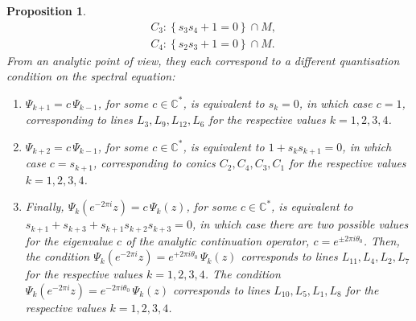 \documentclass[a4paper,reqno]{amsart}
\numberwithin{equation}{section}
\newtheorem{proposition}[theorem]{Proposition}
\numberwithin{equation}{section}
\begin{document}
\begin{proposition}
\begin{equation}
\begin{aligned}
            &C_3 : \left\{ s_3 s_4 + 1=0\right\}\cap M, \\
            &C_4 : \left\{ s_2 s_3 + 1=0\right\}\cap M. 
    \end{aligned}
    \end{equation}
From an analytic point of view, they each correspond to a different quantisation condition on the spectral equation:
 \begin{enumerate}
     \item $\Psi_{k+1}=c\,\Psi_{k-1}$, for some $c\in\mathbb{C}^*$, is equivalent to $s_k=0$, in which case $c=1$, corresponding to lines $L_3,L_9,L_{12},L_{6}$ for the respective values $k=1,2,3,4$.
     \item $\Psi_{k+2}=c\,\Psi_{k-1}$, for some $c\in\mathbb{C}^*$, is equivalent to $1+s_ks_{k+1}=0$, in which case $c=s_{k+1}$, corresponding to conics $C_2,C_4,C_3,C_1$ for the respective values $k=1,2,3,4$.
     \item Finally, $\Psi_k(e^{-2\pi i}z)=c\,\Psi_k(z)$, for some $c\in\mathbb{C}^*$, is equivalent to $s_{k+1}+s_{k+3}+s_{k+1}s_{k+2}s_{k+3}=0$, in which case there are two possible values for the eigenvalue $c$ of the analytic continuation operator, $c=e^{\pm 2\pi i\theta_0}$. Then, the condition $\Psi_k(e^{-2\pi i}z)=e^{+ 2\pi i\theta_0}\,\Psi_k(z)$ corresponds to lines $ L_{11}, L_{4}, L_2,L_7$ for the respective values $k=1,2,3,4$. The condition $\Psi_k(e^{-2\pi i}z)=e^{- 2\pi i\theta_0}\,\Psi_k(z)$ corresponds to lines $ L_{10}, L_{5}, L_1,L_8$ for the respective values $k=1,2,3,4$.
 \end{enumerate}
    \end{proposition}
\end{document}
